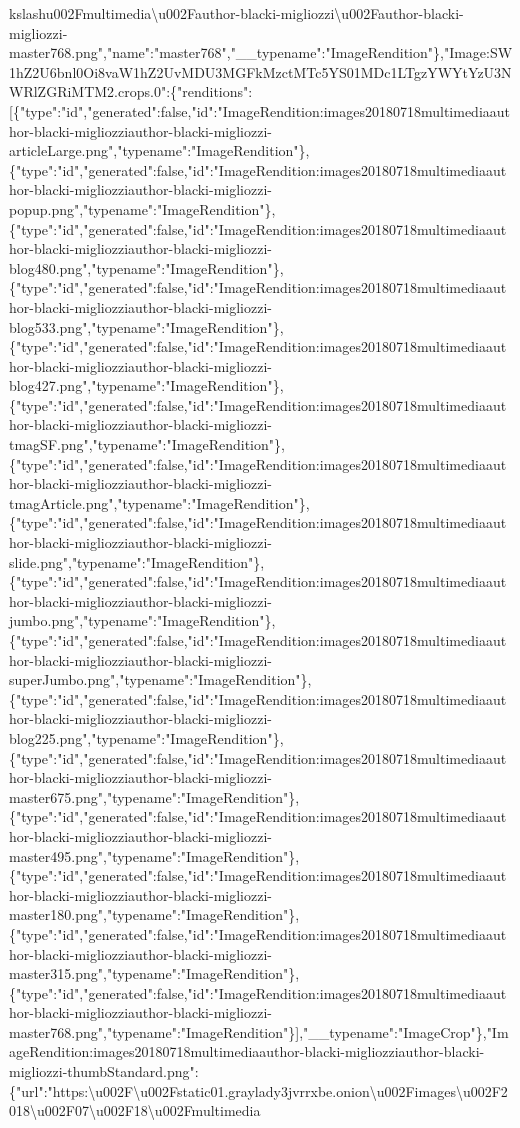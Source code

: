 kslash{}u002Fmultimedia\textbackslash{}u002Fauthor-blacki-migliozzi\textbackslash{}u002Fauthor-blacki-migliozzi-master768.png","name":"master768","\_\_typename":"ImageRendition"\},"Image:SW1hZ2U6bnl0Oi8vaW1hZ2UvMDU3MGFkMzctMTc5YS01MDc1LTgzYWYtYzU3NWRlZGRiMTM2.crops.0":\{"renditions":{[}\{"type":"id","generated":false,"id":"ImageRendition:images20180718multimediaauthor-blacki-migliozziauthor-blacki-migliozzi-articleLarge.png","typename":"ImageRendition"\},\{"type":"id","generated":false,"id":"ImageRendition:images20180718multimediaauthor-blacki-migliozziauthor-blacki-migliozzi-popup.png","typename":"ImageRendition"\},\{"type":"id","generated":false,"id":"ImageRendition:images20180718multimediaauthor-blacki-migliozziauthor-blacki-migliozzi-blog480.png","typename":"ImageRendition"\},\{"type":"id","generated":false,"id":"ImageRendition:images20180718multimediaauthor-blacki-migliozziauthor-blacki-migliozzi-blog533.png","typename":"ImageRendition"\},\{"type":"id","generated":false,"id":"ImageRendition:images20180718multimediaauthor-blacki-migliozziauthor-blacki-migliozzi-blog427.png","typename":"ImageRendition"\},\{"type":"id","generated":false,"id":"ImageRendition:images20180718multimediaauthor-blacki-migliozziauthor-blacki-migliozzi-tmagSF.png","typename":"ImageRendition"\},\{"type":"id","generated":false,"id":"ImageRendition:images20180718multimediaauthor-blacki-migliozziauthor-blacki-migliozzi-tmagArticle.png","typename":"ImageRendition"\},\{"type":"id","generated":false,"id":"ImageRendition:images20180718multimediaauthor-blacki-migliozziauthor-blacki-migliozzi-slide.png","typename":"ImageRendition"\},\{"type":"id","generated":false,"id":"ImageRendition:images20180718multimediaauthor-blacki-migliozziauthor-blacki-migliozzi-jumbo.png","typename":"ImageRendition"\},\{"type":"id","generated":false,"id":"ImageRendition:images20180718multimediaauthor-blacki-migliozziauthor-blacki-migliozzi-superJumbo.png","typename":"ImageRendition"\},\{"type":"id","generated":false,"id":"ImageRendition:images20180718multimediaauthor-blacki-migliozziauthor-blacki-migliozzi-blog225.png","typename":"ImageRendition"\},\{"type":"id","generated":false,"id":"ImageRendition:images20180718multimediaauthor-blacki-migliozziauthor-blacki-migliozzi-master675.png","typename":"ImageRendition"\},\{"type":"id","generated":false,"id":"ImageRendition:images20180718multimediaauthor-blacki-migliozziauthor-blacki-migliozzi-master495.png","typename":"ImageRendition"\},\{"type":"id","generated":false,"id":"ImageRendition:images20180718multimediaauthor-blacki-migliozziauthor-blacki-migliozzi-master180.png","typename":"ImageRendition"\},\{"type":"id","generated":false,"id":"ImageRendition:images20180718multimediaauthor-blacki-migliozziauthor-blacki-migliozzi-master315.png","typename":"ImageRendition"\},\{"type":"id","generated":false,"id":"ImageRendition:images20180718multimediaauthor-blacki-migliozziauthor-blacki-migliozzi-master768.png","typename":"ImageRendition"\}{]},"\_\_typename":"ImageCrop"\},"ImageRendition:images20180718multimediaauthor-blacki-migliozziauthor-blacki-migliozzi-thumbStandard.png":\{"url":"https:\textbackslash{}u002F\textbackslash{}u002Fstatic01.graylady3jvrrxbe.onion\textbackslash{}u002Fimages\textbackslash{}u002F2018\textbackslash{}u002F07\textbackslash{}u002F18\textbackslash{}u002Fmultimedia\textba